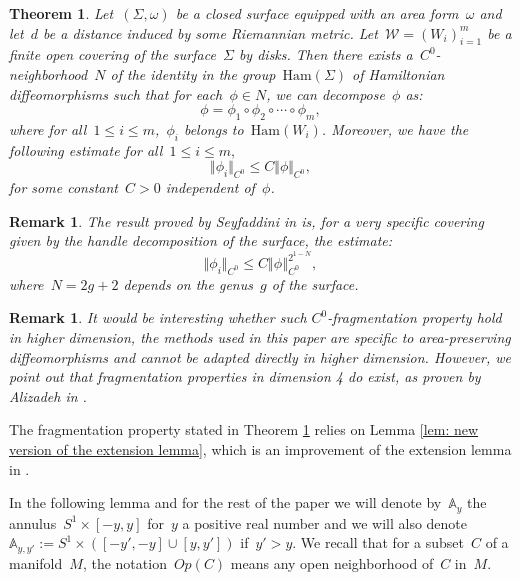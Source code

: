\documentclass[10pt]{amsart}
\newtheorem{thm}{Theorem}
\newtheorem{rk}[prop]{Remark}
\newcommand{\Ham}{\mathrm{Ham}}
\begin{document}
\begin{thm}\label{thm: fragmentation lemma on surfaces with Lipschitz estimate}
	Let~$(\Sigma,\omega)$ be a closed surface equipped with an area form~$\omega$ and let~$d$ be a distance induced by some Riemannian metric. Let~$\mathcal{W}=(W_i)_{i=1}^m$ be a finite open covering of the surface~$\Sigma$ by disks. Then there exists a~$C^0$-neighborhood~$N$ of the identity in the group~$\Ham(\Sigma)$ of Hamiltonian diffeomorphisms such that for each~$\phi\in N$, we can decompose~$\phi$ as:
	$$\phi=\phi_1 \circ \phi_2 \circ \cdots \circ \phi_m,$$
	where for all~$1\leq i\leq m$,~$\phi_i$ belongs to~$\Ham(W_i)$. Moreover, we have the following estimate for all~$1\leq i\leq m,$
	$$\Vert \phi_i \Vert_{C^0}\leq C \Vert \phi \Vert_{C^0},$$
	for some constant~$C>0$ independent of~$\phi$.
\end{thm}

\begin{rk} 
	The result proved by Seyfaddini in \cite[Proposition 3.1]{Seyfaddini} is, for a very specific covering given by the handle decomposition of the surface, the estimate:~$$\Vert \phi_i \Vert_{C^0}\leq C \left \Vert\phi\right \Vert_{C^0}^{2^{1-N}},$$
	where~$N= 2g+2$ depends on the genus~$g$ of the surface.
\end{rk}

\begin{rk}
It would be interesting whether such $C^0$-fragmentation property hold in higher dimension, the methods used in this paper are specific to area-preserving diffeomorphisms and cannot be adapted directly in higher dimension. However, we point out that fragmentation properties in dimension 4 do exist, as proven by Alizadeh in \cite{Ali}.
\end{rk}

The fragmentation property stated in Theorem \ref{thm: fragmentation lemma on surfaces with Lipschitz estimate} relies on Lemma \ref{lem: new version of the extension lemma}, which is an improvement of the extension lemma in \cite[Section 3.4.2]{Seyfaddini}.

In the following lemma and for the rest of the paper we will denote by~$\mathbb{A}_y$ the annulus~$S^1\times [-y,y]$ for~$y$ a positive real number and we will also denote~$\mathbb{A}_{y,y'}:=S^1\times ([-y',-y] \cup [y,y'])$ if~$y' >y$. We recall that for a subset~$C$ of a manifold~$M$, the notation~$Op(C)$ means any open neighborhood of~$C$ in~$M$.
\end{document}
